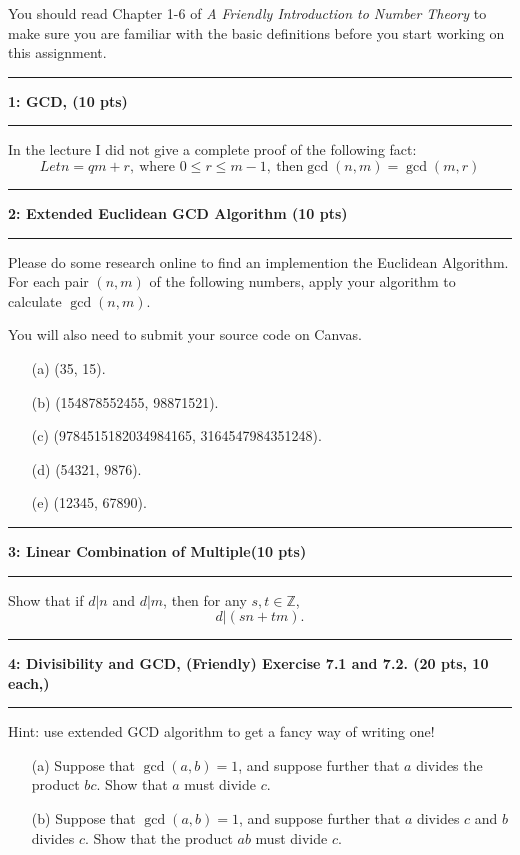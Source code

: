 \documentclass[11pt]{article}
\newcommand\question[2]{\vspace{.25in}\hrule\textbf{#1: #2}\vspace{.5em}\hrule\vspace{.10in}}
\newcommand{\Z}{\mathbb{Z}}
\begin{document}
\raggedright
\newcommand\NAME{Xiang Huang}  %
\newcommand\UISID{\texttt{UISid}}     %
\newcommand\HWNUM{4}              %






You should read Chapter 1-6 of \textit{A Friendly Introduction to Number Theory} to make sure you are familiar with the basic definitions before you start working on this assignment.

\question{1}{GCD, (10 pts)}
In the lecture I did not give a complete proof of the following fact:
\[
     Let n= qm +r, \ \text{where } 0\leq r\leq m-1, \ \text{then} \gcd(n,m)=\gcd(m,r)
\]
\question{2}{Extended Euclidean GCD Algorithm (10 pts)}
Please do some research online to find an implemention the Euclidean Algorithm. For each pair $(n,m)$ of the following numbers, apply your algorithm to calculate $\gcd(n,m)$.

You will also need to submit your source code on Canvas.

\begin{enumerate}
    \item[(a)] (35, 15).
    \item[(b)] (154878552455, 98871521).
    \item[(c)] (9784515182034984165, 3164547984351248).
    \item[(d)] (54321, 9876).
    \item[(e)] (12345, 67890).
\end{enumerate}

\question{3}{Linear Combination of Multiple(10 pts)}
Show that if $d|n$ and $d|m$, then for any $s,t\in \Z$,
\[
    d| (sn + tm).
\]

\question{4}{Divisibility and GCD, (Friendly) Exercise 7.1 and 7.2. (20 pts, 10 each,)}
Hint: use extended GCD algorithm to get a fancy way of writing one!
\begin{enumerate}
    \item[(a)] Suppose that $\gcd(a,b)=1$, and suppose further that $a$ divides the product $bc$. Show that $a$ must divide $c$.
    \item[(b)] Suppose that $\gcd(a,b)=1$, and suppose further that $a$ divides $c$ and $b$ divides $c$. Show that the product $ab$ must divide $c$.
\end{enumerate}
\end{document}
